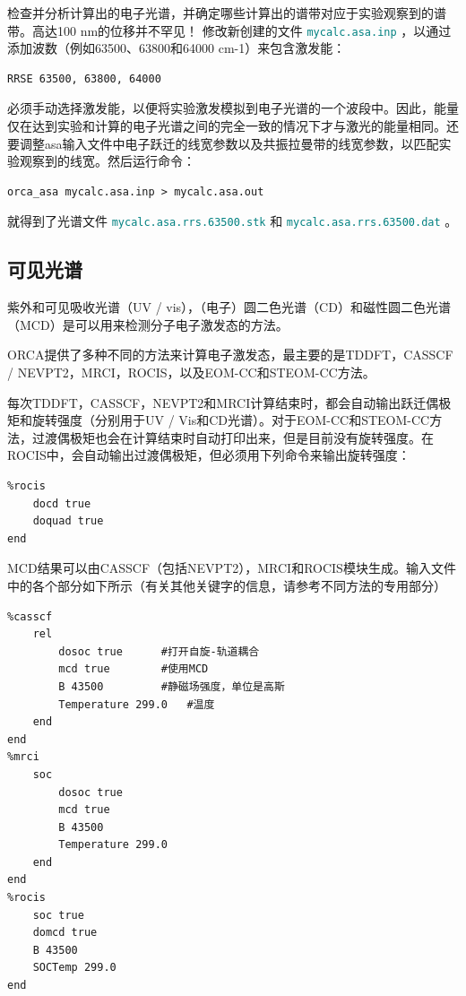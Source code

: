 \documentclass{ctexart}
\newcommand{\file}[1]{ \textcolor{teal}{\texttt{#1}} }
\begin{document}
	检查并分析计算出的电子光谱，并确定哪些计算出的谱带对应于实验观察到的谱带。高达100 nm的位移并不罕见！
	修改新创建的文件\file{mycalc.asa.inp}，以通过添加波数（例如63500、63800和64000 cm-1）来包含激发能：
	
	\begin{lstlisting}
RRSE 63500, 63800, 64000
	\end{lstlisting}
	
	必须手动选择激发能，以便将实验激发模拟到电子光谱的一个波段中。因此，能量仅在达到实验和计算的电子光谱之间的完全一致的情况下才与激光的能量相同。还要调整asa输入文件中电子跃迁的线宽参数以及共振拉曼带的线宽参数，以匹配实验观察到的线宽。然后运行命令：
	
	\begin{lstlisting}
orca_asa mycalc.asa.inp > mycalc.asa.out
	\end{lstlisting}
	
	就得到了光谱文件\file{mycalc.asa.rrs.63500.stk}和\file{mycalc.asa.rrs.63500.dat}。
	
	\subsection{可见光谱} 
	
	紫外和可见吸收光谱（UV / vis），（电子）圆二色光谱（CD）和磁性圆二色光谱（MCD）是可以用来检测分子电子激发态的方法。
	
	ORCA提供了多种不同的方法来计算电子激发态，最主要的是TDDFT，CASSCF / NEVPT2，MRCI，ROCIS，以及EOM-CC和STEOM-CC方法。
	
	每次TDDFT，CASSCF，NEVPT2和MRCI计算结束时，都会自动输出跃迁偶极矩和旋转强度（分别用于UV / Vis和CD光谱）。对于EOM-CC和STEOM-CC方法，过渡偶极矩也会在计算结束时自动打印出来，但是目前没有旋转强度。在ROCIS中，会自动输出过渡偶极矩，但必须用下列命令来输出旋转强度：
	
	\begin{lstlisting}
%rocis
	docd true 
	doquad true
end
	\end{lstlisting}
	
	MCD结果可以由CASSCF（包括NEVPT2），MRCI和ROCIS模块生成。输入文件中的各个部分如下所示（有关其他关键字的信息，请参考不同方法的专用部分）
	
	\begin{lstlisting}
%casscf 
	rel
		dosoc true		#打开自旋-轨道耦合
		mcd true		#使用MCD
		B 43500			#静磁场强度，单位是高斯
		Temperature 299.0	#温度
	end 
end
%mrci
	soc
		dosoc true 
		mcd true
		B 43500
		Temperature 299.0 
	end
end
%rocis 
	soc true
	domcd true 
	B 43500
	SOCTemp 299.0
end
	\end{lstlisting}
	
\end{document}
